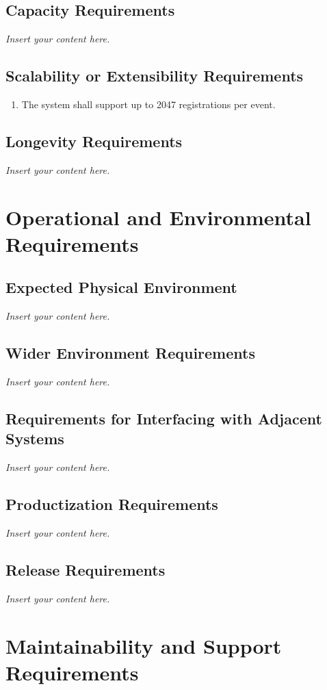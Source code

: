 \documentclass[12pt]{article}
\newcommand{\lips}{\textit{Insert your content here.}}
\begin{document}
\subsection{Capacity Requirements}
\lips
\subsection{Scalability or Extensibility Requirements}
\begin{enumerate}[align=left,
  leftmargin=*,
  labelsep=1em,
  itemindent=0em,
  label=\bfseries SE-\arabic*:]
  \item \label{PSER} The system shall support up to 2047 registrations per event.
\end{enumerate}
\subsection{Longevity Requirements}
\lips

\section{Operational and Environmental Requirements}
\subsection{Expected Physical Environment}
\lips
\subsection{Wider Environment Requirements}
\lips
\subsection{Requirements for Interfacing with Adjacent Systems}
\lips
\subsection{Productization Requirements}
\lips
\subsection{Release Requirements}
\lips

\section{Maintainability and Support Requirements}
\end{document}
